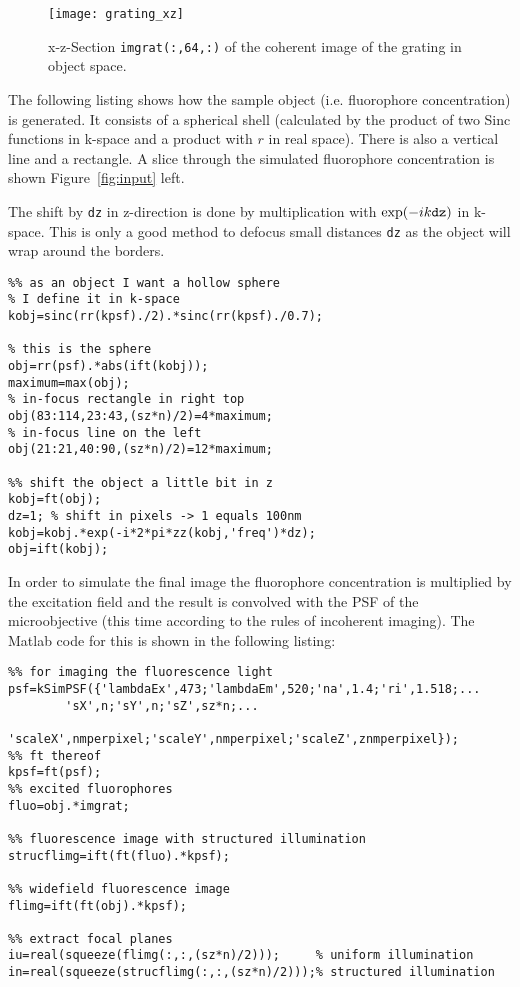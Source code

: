 \documentclass[11pt,abstracton,titlepage]{scrartcl}
\newcommand{\figref}[1]{Figure~\ref{#1}}
\begin{document}
\begin{figure}[htb]
  \centering
  \texttt{[image: grating\_xz]}

  \caption{x-z-Section {\tt imgrat(:,64,:)} of the coherent
    image of the grating in object space.}
  \label{fig:grating}
\end{figure}

The following listing shows how the sample object (i.e. fluorophore
concentration) is generated.  It consists of a spherical shell
(calculated by the product of two Sinc functions in k-space and a
product with $r$ in real space). There is also a vertical line and a
rectangle. A slice through the simulated fluorophore concentration is
shown \figref{fig:input} left.

The shift by {\tt dz} in z-direction is done by multiplication with
$\exp(-ik{\tt dz})$ in k-space. This is only a good method to defocus
small distances {\tt dz} as the object will wrap around the borders.

\begin{lstlisting}
%% as an object I want a hollow sphere
% I define it in k-space
kobj=sinc(rr(kpsf)./2).*sinc(rr(kpsf)./0.7);

% this is the sphere
obj=rr(psf).*abs(ift(kobj));
maximum=max(obj);
% in-focus rectangle in right top
obj(83:114,23:43,(sz*n)/2)=4*maximum;
% in-focus line on the left
obj(21:21,40:90,(sz*n)/2)=12*maximum;

%% shift the object a little bit in z
kobj=ft(obj);
dz=1; % shift in pixels -> 1 equals 100nm
kobj=kobj.*exp(-i*2*pi*zz(kobj,'freq')*dz);
obj=ift(kobj);
\end{lstlisting}

In order to simulate the final image the fluorophore concentration is
multiplied by the excitation field and the result is convolved with
the PSF of the microobjective (this time according to the rules of
incoherent imaging). The Matlab code for this is shown in the
following listing:
\begin{lstlisting}
%% for imaging the fluorescence light
psf=kSimPSF({'lambdaEx',473;'lambdaEm',520;'na',1.4;'ri',1.518;...
        'sX',n;'sY',n;'sZ',sz*n;...
        'scaleX',nmperpixel;'scaleY',nmperpixel;'scaleZ',znmperpixel});
%% ft thereof
kpsf=ft(psf);
%% excited fluorophores
fluo=obj.*imgrat;

%% fluorescence image with structured illumination
strucflimg=ift(ft(fluo).*kpsf);

%% widefield fluorescence image
flimg=ift(ft(obj).*kpsf);

%% extract focal planes
iu=real(squeeze(flimg(:,:,(sz*n)/2)));     % uniform illumination
in=real(squeeze(strucflimg(:,:,(sz*n)/2)));% structured illumination
\end{lstlisting}
\end{document}
